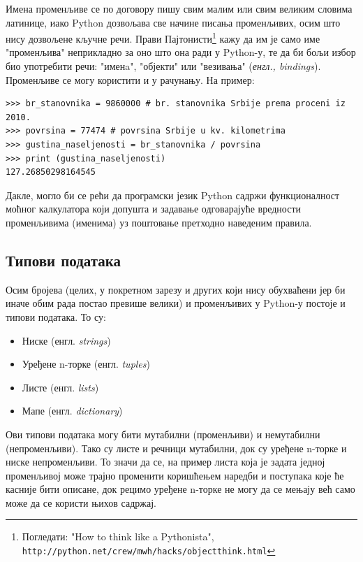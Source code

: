 \documentclass[11pt, serbianc, english, titlepage]{article}
\begin{document}
		
		
		
		
		Имена променљиве се по договору пишу свим малим или свим великим словима латинице, иако Python дозвољава све начине писања променљивих, осим што нису дозвољене кључне речи. Прави Пајтонисти\footnote{Погледати: "How to think like a Pythonista", \texttt{http://python.net/crew/mwh/hacks/objectthink.html} } кажу да им је само име "променљива" неприкладно за оно што она ради у Python-у, те да би бољи избор био употребити речи: "именa",  "објекти" или "везивања" (\emph{енгл., bindings}).\\
		Променљиве се могу користити и у рачунању. На пример:
\begin{lstlisting}[caption = Пример коришћења променљивих, label = variables]
>>> br_stanovnika = 9860000 # br. stanovnika Srbije prema proceni iz 2010.
>>> povrsina = 77474 # povrsina Srbije u kv. kilometrima
>>> gustina_naseljenosti = br_stanovnika / povrsina
>>> print (gustina_naseljenosti)
127.26850298164545
\end{lstlisting}

		Дакле, могло би се рећи да програмски језик Python садржи функционалност моћног калкулатора који допушта и задавање одговарајуће вредности променљивима (именима) уз поштовање претходно наведеним правила.
		\subsection{Типови података}
		Осим бројева (целих, у покретном зарезу и других који нису обухваћени јер би иначе обим рада постао превише велики) и променљивих у Python-у постоје и типови података. То су:
		\begin{itemize}
		\item Ниске (енгл. \emph{strings})
		\item Уређене n-торке (енгл. \emph{tuples})
		\item Листе (енгл. \emph{lists})
		\item Мапе (енгл. \emph{dictionary})
		\end{itemize}
		Ови типови података могу бити мутабилни (променљиви) и немутабилни (непроменљиви). Тако су листе и речници мутабилни, док су уређене n-торке и ниске непроменљиви. То значи да се, на пример листа која је задата једној променљивој може трајно променити коришћењем наредби и поступака које ће касније бити описане, док рецимо уређене n-торке не могу да се мењају већ само може да се користи њихов садржај.
\end{document}
